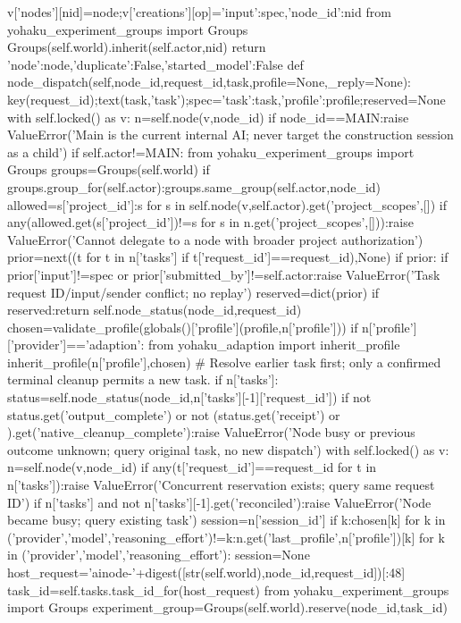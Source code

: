    v['nodes'][nid]=node;v['creations'][op]={'input':spec,'node_id':nid}
   from yohaku_experiment_groups import Groups
   Groups(self.world).inherit(self.actor,nid)
   return {'node':node,'duplicate':False,'started_model':False}
 def node_dispatch(self,node_id,request_id,task,profile=None,_reply=None):
  key(request_id);text(task,'task');spec={'task':task,'profile':profile};reserved=None
  with self.locked() as v:
   n=self.node(v,node_id)
   if node_id==MAIN:raise ValueError('Main is the current internal AI; never target the construction session as a child')
   if self.actor!=MAIN:
    from yohaku_experiment_groups import Groups
    groups=Groups(self.world)
    if groups.group_for(self.actor):groups.same_group(self.actor,node_id)
    allowed={s['project_id']:s for s in self.node(v,self.actor).get('project_scopes',[])}
    if any(allowed.get(s['project_id'])!=s for s in n.get('project_scopes',[])):raise ValueError('Cannot delegate to a node with broader project authorization')
   prior=next((t for t in n['tasks'] if t['request_id']==request_id),None)
   if prior:
    if prior['input']!=spec or prior['submitted_by']!=self.actor:raise ValueError('Task request ID/input/sender conflict; no replay')
    reserved=dict(prior)
  if reserved:return self.node_status(node_id,request_id)
  chosen=validate_profile(globals()['profile'](profile,n['profile']))
  if n['profile']['provider']=='adaption':
   from yohaku_adaption import inherit_profile
   inherit_profile(n['profile'],chosen)
  # Resolve earlier task first; only a confirmed terminal cleanup permits a new task.
  if n['tasks']:
   status=self.node_status(node_id,n['tasks'][-1]['request_id'])
   if not status.get('output_complete') or not (status.get('receipt') or {}).get('native_cleanup_complete'):raise ValueError('Node busy or previous outcome unknown; query original task, no new dispatch')
  with self.locked() as v:
   n=self.node(v,node_id)
   if any(t['request_id']==request_id for t in n['tasks']):raise ValueError('Concurrent reservation exists; query same request ID')
   if n['tasks'] and not n['tasks'][-1].get('reconciled'):raise ValueError('Node became busy; query existing task')
   session=n['session_id']
   if {k:chosen[k] for k in ('provider','model','reasoning_effort')}!={k:n.get('last_profile',n['profile'])[k] for k in ('provider','model','reasoning_effort')}:
    session=None
   host_request='ainode-'+digest([str(self.world),node_id,request_id])[:48]
   task_id=self.tasks.task_id_for(host_request)
   from yohaku_experiment_groups import Groups
   experiment_group=Groups(self.world).reserve(node_id,task_id)
